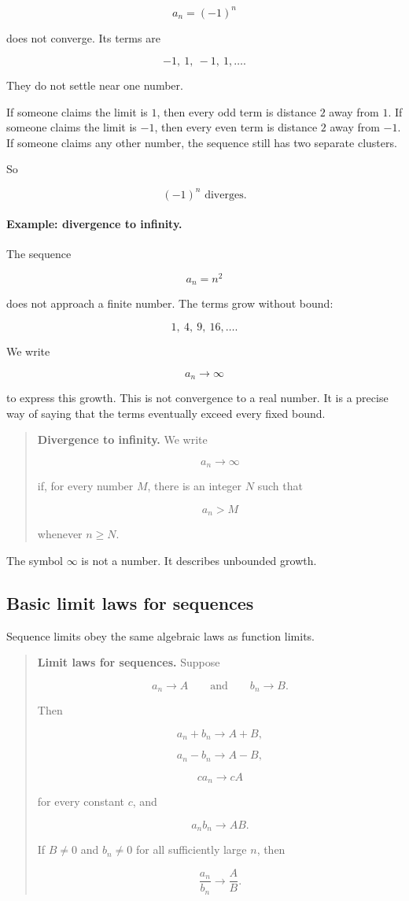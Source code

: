 \[
a_n=(-1)^n
\]

does not converge.  Its terms are

\[
-1,\ 1,\ -1,\ 1,\ldots.
\]

They do not settle near one number.

If someone claims the limit is \(1\), then every odd term is distance \(2\) away from
\(1\).  If someone claims the limit is \(-1\), then every even term is distance \(2\) away
from \(-1\).  If someone claims any other number, the sequence still has two separate
clusters.

So

\[
\boxed{
(-1)^n \text{ diverges.}
}
\]

\paragraph{Example: divergence to infinity.}
The sequence

\[
a_n=n^2
\]

does not approach a finite number.  The terms grow without bound:

\[
1,\ 4,\ 9,\ 16,\ldots.
\]

We write

\[
a_n\to\infty
\]

to express this growth.  This is not convergence to a real number.  It is a precise way
of saying that the terms eventually exceed every fixed bound.

\begin{quote}
\textbf{Divergence to infinity.}
We write

\[
a_n\to\infty
\]

if, for every number \(M\), there is an integer \(N\) such that

\[
a_n>M
\]

whenever \(n\ge N\).
\end{quote}

The symbol \(\infty\) is not a number.  It describes unbounded growth.

\subsection{Basic limit laws for sequences}
\label{subsec:basic-limit-laws-sequences}

Sequence limits obey the same algebraic laws as function limits.

\begin{quote}
\textbf{Limit laws for sequences.}
Suppose

\[
a_n\to A
\qquad\text{and}\qquad
b_n\to B.
\]

Then

\[
a_n+b_n\to A+B,
\]

\[
a_n-b_n\to A-B,
\]

\[
ca_n\to cA
\]

for every constant \(c\), and

\[
a_nb_n\to AB.
\]

If \(B\neq0\) and \(b_n\neq0\) for all sufficiently large \(n\), then

\[
\frac{a_n}{b_n}\to \frac AB.
\]
\end{quote}

